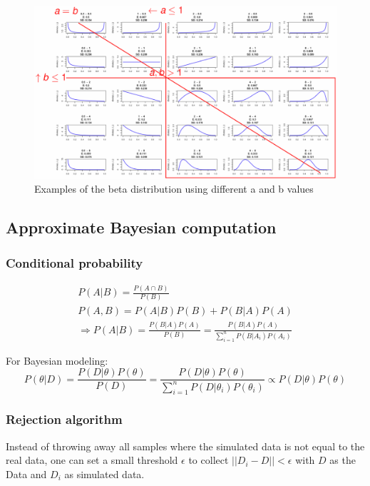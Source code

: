 \begin{figure}[H]
	\centering
	\includegraphics[width=\textwidth]{images/beta-examples.png}
	\caption{Examples of the beta distribution using different a and b values}
\end{figure}

\subsection{Approximate Bayesian computation}
\subsubsection{Conditional probability}
\begin{gather*}
P(A|B) = \frac{P(A\cap B)}{P(B)}\\
P(A,B) = P(A|B)P(B) + P(B|A)P(A)\\
\Rightarrow P(A|B) = \frac{P(B|A)P(A)}{P(B)} = \frac{P(B|A)P(A)}{\sum_{i=1}^{n}P(B|A_i)P(A_i)}
\end{gather*}

For Bayesian modeling:
\begin{equation*}
P(\theta|D) = \frac{P(D|\theta)P(\theta)}{P(D)} = \frac{P(D|\theta)P(\theta)}{\sum_{i=1}^{n}P(D|\theta_i)P(\theta_i)} \propto P(D|\theta)P(\theta)
\end{equation*}

\subsubsection{Rejection algorithm}
Instead of throwing away all samples where the simulated data is not equal to the real data, one can set a small threshold $\epsilon$ to collect $||D_i-D||<\epsilon$ with $D$ as the Data and $D_i$ as simulated data. 


